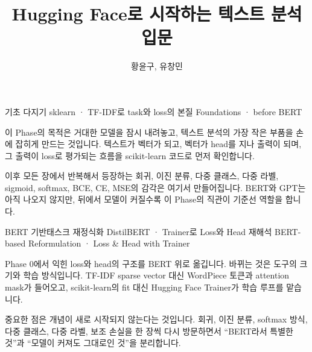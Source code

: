 \documentclass[11pt]{book}
\title{Hugging Face로 시작하는 텍스트 분석 입문}
\author{황윤구, 유창민}
\date{}
\providecommand{\chapterdir}{chapters}
\newcommand{\inputchapter}[1]{}
\begin{document}
\ifdefined\bookpublisherdraftenabled
  \bookpublisherdraftwatermark
\fi

\frontmatter



\setcounter{tocdepth}{0}
\tableofcontents
\cleardoublepage
{}
\listoffigures
\cleardoublepage
{}
\listoftables

\mainmatter
{}
  {기초 다지기}
  {sklearn · TF-IDF로 task와 loss의 본질}
  {Foundations · before BERT}
  {
    이 Phase의 목적은 거대한 모델을 잠시 내려놓고, 텍스트 분석의 가장 작은 부품을 손에 잡히게 만드는 것입니다. 텍스트가 벡터가 되고, 벡터가 head를 지나 출력이 되며, 그 출력이 loss로 평가되는 흐름을 scikit-learn 코드로 먼저 확인합니다.

    이후 모든 장에서 반복해서 등장하는 회귀, 이진 분류, 다중 클래스, 다중 라벨, sigmoid, softmax, BCE, CE, MSE의 감각은 여기서 만들어집니다. BERT와 GPT는 아직 나오지 않지만, 뒤에서 모델이 커질수록 이 Phase의 직관이 기준선 역할을 합니다.
  }
  {
  }
\inputchapter{ch01_tfidf}
\inputchapter{ch02_sklearn_regression}
\inputchapter{ch03_sklearn_binary}
\inputchapter{ch04_softmax_binary}
\inputchapter{ch05_sklearn_multiclass}
\inputchapter{ch06_sklearn_multilabel}

  {BERT 기반\hfphasebreak 태스크 재정식화}
  {DistilBERT · Trainer로 Loss와 Head 재해석}
  {BERT-based Reformulation · Loss \& Head with Trainer}
  {
    Phase 0에서 익힌 loss와 head의 구조를 BERT 위로 옮깁니다. 바뀌는 것은 도구의 크기와 학습 방식입니다. TF-IDF sparse vector 대신 WordPiece 토큰과 attention mask가 들어오고, scikit-learn의 fit 대신 Hugging Face Trainer가 학습 루프를 맡습니다.

    중요한 점은 개념이 새로 시작되지 않는다는 것입니다. 회귀, 이진 분류, softmax 방식, 다중 클래스, 다중 라벨, 보조 손실을 한 장씩 다시 방문하면서 “BERT라서 특별한 것”과 “모델이 커져도 그대로인 것”을 분리합니다.
  }
  {
  }
\inputchapter{ch07_bert_pipeline}
\inputchapter{ch08_tokenizer_datasets}
\inputchapter{ch09_bert_regression}
\inputchapter{ch10_bert_binary_sigmoid}
\inputchapter{ch11_bert_binary_softmax}
\inputchapter{ch12_bert_multiclass}
\inputchapter{ch13_bert_multilabel}
\inputchapter{ch14_auxiliary_loss}
\end{document}
